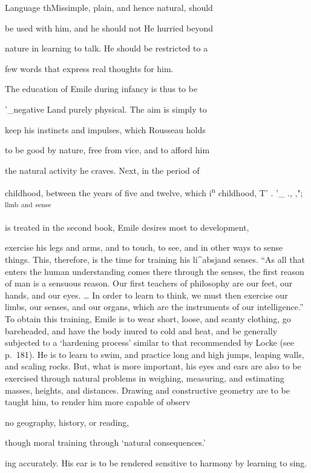 \documentclass[]{book}
\begin{document}
Language thMissimple, plain, and hence natural, should

be used with him, and he should not He hurried beyond

nature in learning to talk. He should be restricted to a

few words that express real thoughts for him.

The education of Emile during infancy is thus to be

'\_negative Land purely physical. The aim is simply to

keep his instincts and impulses, which Rousseau holds

to be good by nature, free from vice, and to afford him

the natural activity he craves. Next, in the period of

childhood, between the years of five and twelve, which i\textsuperscript{n} childhood, T' . '\_ ., ,"; \textsuperscript{llmb} \textsuperscript{and} \textsuperscript{sense}

is treated in the second book, Emile desires most to development,

exercise his legs and arms, and to touch, to see, and in other ways to sense things. This, therefore, is the time for training his li\^{}absjand senses. ``As all that enters the human understanding comes there through the senses, the first reason of man is a sensuous reason. Our first teachers of philosophy are our feet, our hands, and our eyes. \ldots{} In order to learn to think, we must then exercise our limbs, our senses, and our organs, which are the instruments of our intelligence.'' To obtain this training, Emile is to wear short, loose, and scanty clothing, go bareheaded, and have the body inured to cold and heat, and be generally subjected to a `hardening process' similar to that recommended by Locke (see p.~181). He is to learn to swim, and practice long and high jumps, leaping walls, and scaling rocks. But, what is more important, his eyes and ears are also to be exercised through natural problems in weighing, measuring, and estimating masses, heights, and distances. Drawing and constructive geometry are to be taught him, to render him more capable of observ

no geography, history, or reading,

though moral training through `natural consequences.'

ing accurately. His ear is to be rendered sensitive to harmony by learning to sing.
\end{document}
